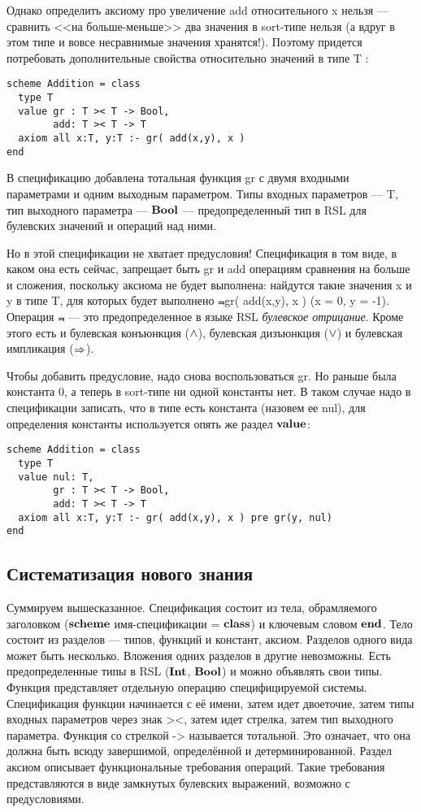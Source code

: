 \documentclass[14pt]{extreport}
\begin{document}
Однако определить аксиому про увеличение add относительного x нельзя --- сравнить <<на больше-меньше>> два значения в sort-типе нельзя (а вдруг в этом типе и вовсе несравнимые значения хранятся!). Поэтому придется потребовать дополнительные свойства относительно значений в типе T :
\begin{lstlisting}
scheme Addition = class
  type T
  value gr : T >< T -> Bool,
        add: T >< T -> T
  axiom all x:T, y:T :- gr( add(x,y), x )
end
\end{lstlisting}

В спецификацию добавлена тотальная функция gr с двумя входными параметрами и одним выходным параметром. Типы входных параметров --- T, тип выходного параметра --- $\textbf{Bool}$ --- предопределенный тип в RSL для булевских значений и операций над ними.

Но в этой спецификации не хватает предусловия! Спецификация в том виде, в каком она есть сейчас, запрещает быть gr и add операциям сравнения на больше и сложения, поскольку аксиома не будет выполнена: найдутся такие значения x и y в типе T, для которых будет выполнено $\Not$gr( add(x,y), x ) (x = 0, y = -1). Операция $\Not$ --- это предопределенное в языке RSL \emph{булевское отрицание}. Кроме этого есть и булевская конъюнкция ($\wedge$), булевская дизъюнкция ($\vee$) и булевская импликация ($\mathop{\Rightarrow}$).

Чтобы добавить предусловие, надо снова воспользоваться gr. Но раньше была константа 0, а теперь в sort-типе ни одной константы нет. В таком случае надо в спецификации записать, что в типе есть константа (назовем ее nul), для определения константы используется опять же раздел $\textbf{value}$:
\begin{lstlisting}
scheme Addition = class
  type T
  value nul: T,
        gr : T >< T -> Bool,
        add: T >< T -> T
  axiom all x:T, y:T :- gr( add(x,y), x ) pre gr(y, nul)
end
\end{lstlisting}

\subsection*{Систематизация нового знания}
Суммируем вышесказанное. Спецификация состоит из тела, обрамляемого заголовком ($\mathop{\textbf{scheme}}$ имя-спецификации = $\mathop{\textbf{class}}$) и ключевым словом $\textbf{end}$. Тело состоит из разделов --- типов, функций и констант, аксиом. Разделов одного вида может быть несколько. Вложения одних разделов в другие невозможны. Есть предопределенные типы в RSL ($\textbf{Int}$, $\textbf{Bool}$) и можно объявлять свои типы. Функция представляет отдельную операцию специфицируемой системы. Спецификация функции начинается с её имени, затем идет двоеточие, затем типы входных параметров через знак ><, затем идет стрелка, затем тип выходного параметра. Функция со стрелкой -> называется тотальной. Это означает, что она должна быть всюду завершимой, определённой и детерминированной. Раздел аксиом описывает функциональные требования операций. Такие требования представляются в виде замкнутых булевских выражений, возможно с предусловиями.
\end{document}

